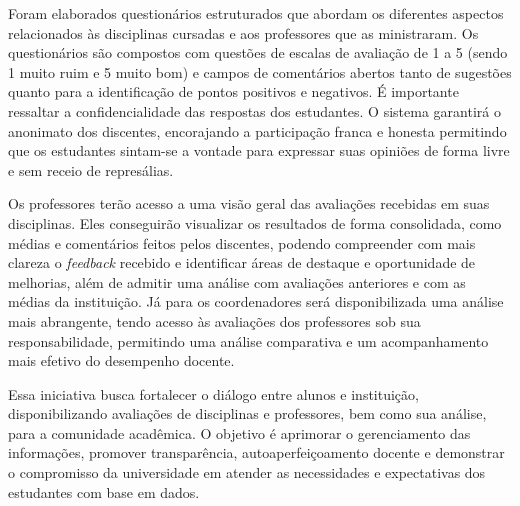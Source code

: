 Foram elaborados questionários estruturados que abordam os diferentes aspectos relacionados às disciplinas cursadas e aos professores que as ministraram. Os questionários são compostos com questões de escalas de avaliação de 1 a 5 (sendo 1 muito ruim e 5 muito bom) e campos de comentários abertos tanto de sugestões quanto para a identificação de pontos positivos e negativos. É importante ressaltar a confidencialidade das respostas dos estudantes. O sistema garantirá o anonimato dos discentes, encorajando a participação franca e honesta permitindo que os estudantes sintam-se a vontade para expressar suas opiniões de forma livre e sem receio de represálias.


Os professores terão acesso a uma visão geral das avaliações recebidas em suas disciplinas. 
Eles conseguirão visualizar os resultados de forma consolidada, como médias e comentários feitos pelos discentes, podendo compreender com mais clareza o \textit{feedback} recebido e identificar áreas de destaque e oportunidade de melhorias, além de admitir uma análise com avaliações anteriores e com as médias da instituição. Já para os coordenadores será disponibilizada uma análise mais abrangente, tendo acesso às avaliações dos professores sob sua responsabilidade, permitindo uma análise comparativa e um acompanhamento mais efetivo do desempenho docente. 

Essa iniciativa busca fortalecer o diálogo entre alunos e instituição, disponibilizando avaliações de disciplinas e professores, bem como sua análise, para a comunidade acadêmica. O objetivo é aprimorar o gerenciamento das informações, promover transparência, autoaperfeiçoamento docente e demonstrar o compromisso da universidade em atender as necessidades e expectativas dos estudantes com base em dados.%








